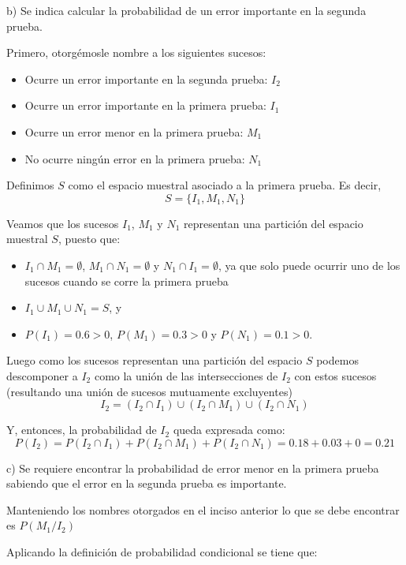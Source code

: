 \documentclass[11pt]{article}
\begin{document}
\vspace{0.5mm}


b) Se indica calcular la probabilidad de un error importante en la segunda prueba. 

Primero, otorg\'emosle nombre a los siguientes sucesos: 
\begin{itemize}
    \item Ocurre un error importante en la segunda prueba: $I_{2}$
    \item Ocurre un error importante en la primera prueba: $I_{1}$
    \item Ocurre un error menor en la primera prueba: $M_{1}$
    \item No ocurre ning\'un error en la primera prueba: $N_{1}$
\end{itemize}

Definimos $S$ como el espacio muestral asociado a la primera prueba.
Es decir, 
\[S=\{I_{1},M_{1},N_{1}\}\]

Veamos que los sucesos $I_{1}$, $M_{1}$ y $N_{1}$ representan una partición del espacio muestral $S$, puesto que: 
\begin{itemize}
    \item $I_{1} \cap  M_{1} = \emptyset$, $M_{1} \cap N_{1} = \emptyset$ y $N_{1} \cap I_{1} = \emptyset$, ya que solo puede ocurrir uno de los sucesos cuando se corre la primera prueba
    \item $I_{1} \cup M_{1} \cup N_{1} = S$, y
    \item $P(I_{1}) = 0.6 > 0$, $P(M_{1}) = 0.3 > 0$ y $P(N_{1}) = 0.1 > 0$. 
\end{itemize}

Luego como los sucesos representan una partici\'on del espacio $S$ podemos descomponer a $I_{2}$ como la uni\'on de las intersecciones de $I_{2}$ con estos sucesos (resultando una uni\'on de sucesos mutuamente excluyentes)
\[I_{2} = (I_{2} \cap I_{1}) \cup (I_{2} \cap M_{1}) \cup (I_{2} \cap N_{1}) \]

Y, entonces, la probabilidad de $I_{2}$ queda expresada como: 
\[P(I_{2}) = P(I_{2}\cap I_{1}) + P(I_{2}\cap M_{1}) + P(I_{2}\cap N_{1}) = 0.18 + 0.03 + 0 = 0.21 \]


c) Se requiere encontrar la probabilidad de error menor en la primera prueba sabiendo que el
error en la segunda prueba es importante.

Manteniendo los nombres otorgados en el inciso anterior lo que se debe encontrar es $P(M_{1}/I_{2})$

Aplicando la definici\'on de probabilidad condicional se tiene que:
\end{document}
